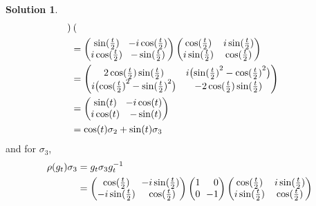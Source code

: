 \documentclass[11pt, a4paper]{report}
\theoremstyle{definition}
\newtheorem{solution}{Solution}[part]
\newenvironment{sol}{\begin{solution}}{\end{solution}\pagebreak[3]}
\newcommand*{\m}{\ensuremath\:\, \mathllap{-}}
\begin{document}
\begin{sol}
\begin{align*}
\begin{pmatrix}
           \end{pmatrix} \\
        &= \begin{pmatrix}
                \sin(\tfrac{t}{2})   & \m i \cos(\tfrac{t}{2}) \\
                i \cos(\tfrac{t}{2}) & \m \sin(\tfrac{t}{2})
            \end{pmatrix}
            \begin{pmatrix}
                \cos(\tfrac{t}{2})   & i \sin(\tfrac{t}{2}) \\
                i \sin(\tfrac{t}{2}) & \cos(\tfrac{t}{2})
           \end{pmatrix} \\
        &= \begin{pmatrix}
                2 \cos(\tfrac{t}{2}) \sin(\tfrac{t}{2})
                    & i \bigl( {\sin(\tfrac{t}{2})}^2 - {\cos(\tfrac{t}{2})}^2 \bigr) \\
                i \bigl( {\cos(\tfrac{t}{2})}^2 - {\sin(\tfrac{t}{2})}^2 \bigr)
                    & -2 \cos(\tfrac{t}{2}) \sin(\tfrac{t}{2})
            \end{pmatrix} \\
        &= \begin{pmatrix}
                \sin(t)   & \m i \cos(t) \\
                i \cos(t) & -\sin(t)
            \end{pmatrix} \\
        &= \cos(t) \sigma_2 + \sin(t) \sigma_3
\end{align*}
and for $\sigma_3$,
\begin{align*}
    \rho(g_t) \sigma_3 &= g_t \sigma_3 g_t^{-1} \\
        &= \begin{pmatrix}
                \cos(\tfrac{t}{2})    & \m i \sin(\tfrac{t}{2}) \\
                -i \sin(\tfrac{t}{2}) & \cos(\tfrac{t}{2})
           \end{pmatrix}
            \begin{pmatrix*}[r]
                1 &  0 \\
                0 & \m 1
            \end{pmatrix*}
            \begin{pmatrix}
                \cos(\tfrac{t}{2})   & i \sin(\tfrac{t}{2}) \\
                i \sin(\tfrac{t}{2}) & \cos(\tfrac{t}{2})
           \end{pmatrix} \\

\end{align*}
\end{sol}
\end{document}
